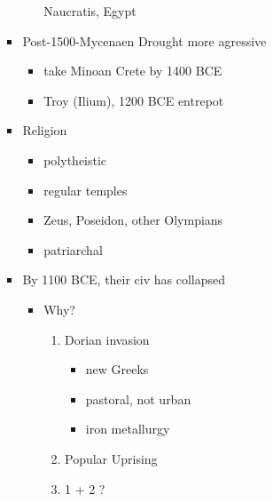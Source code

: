 \documentclass[11pt, a4paper]{article}
\begin{document}
\begin{itemize}
\begin{itemize}
\begin{itemize}
\begin{itemize}
                    Naucratis, Egypt
            \end{itemize}
          \item Post-1500-Mycenaen Drought more agressive
            \begin{itemize}
              \item take Minoan Crete by 1400 BCE
              \item Troy (Ilium), 1200 BCE
                entrepot
            \end{itemize}
          \item Religion
            \begin{itemize}
              \item polytheistic
              \item regular temples
              \item Zeus, Poseidon, other Olympians
              \item patriarchal
            \end{itemize}
          \item By 1100 BCE, their civ has collapsed
            \begin{itemize}
              \item Why?
                \begin{enumerate}
                  \item Dorian invasion 
                    \begin{itemize}
                      \item new Greeks
                      \item pastoral, not urban
                      \item iron metallurgy
                    \end{itemize}
                  \item Popular Uprising
                  \item 1 + 2 ?


\end{enumerate}
\end{itemize}
\end{itemize}
\end{itemize}
\end{itemize}
\end{document}
